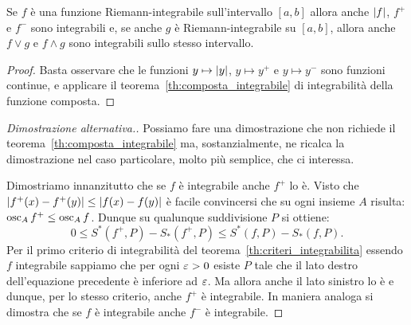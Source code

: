 \begin{theorem}%
\label{th:reticolo}%
Se $f$ è una funzione Riemann-integrabile sull'intervallo $[a,b]$ allora
anche ${\left|f\right|}$, $f^+$ e $f^-$ sono integrabili e, se
anche $g$ è Riemann-integrabile su $[a,b]$, allora anche $f\vee g$ e $f\wedge g$
sono integrabili sullo stesso intervallo.
\end{theorem}
%
\begin{proof}
  Basta osservare che le funzioni 
  $y\mapsto {\left|y\right|}$, $y\mapsto y^+$ e $y\mapsto y^-$ 
  sono funzioni continue, e applicare il teorema~\ref{th:composta_integrabile}
  di integrabilità della funzione composta.
  \end{proof}
  \begin{proof}[Dimostrazione alternativa.]
  Possiamo fare una dimostrazione che non richiede 
  il teorema~\ref{th:composta_integrabile}
  ma, sostanzialmente, ne ricalca la dimostrazione nel 
  caso particolare, molto più semplice, che ci interessa.

  Dimostriamo innanzitutto che se $f$ è integrabile anche $f^+$ lo è.
  Visto che ${\left|f^+(x)-f^+(y)\right|}\le {\left|f(x)-f(y)\right|}$ 
  è facile convincersi che su ogni insieme $A$ risulta: 
  $\operatorname{osc}_A f^+ \le \operatorname{osc}_A f$.
  Dunque su qualunque suddivisione $P$
  si ottiene:
  \[
    0 \le S^*(f^+,P) - S_*(f^+,P) \le S^*(f,P) - S_*(f,P).
  \]
  Per il primo criterio di integrabilità del 
  teorema~\ref{th:criteri_integrabilita} essendo $f$ integrabile 
  sappiamo che per ogni $\varepsilon>0$ esiste $P$ tale che il lato 
  destro dell'equazione precedente è inferiore ad $\varepsilon$.
  Ma allora anche il lato sinistro lo è e dunque, 
  per lo stesso criterio, anche $f^+$ è integrabile.    
  In maniera analoga si dimostra che se $f$ è integrabile 
  anche $f^-$ è integrabile.
  

\end{proof}
